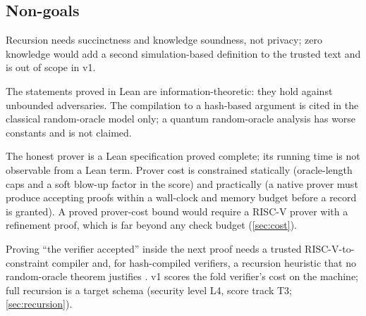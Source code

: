 \subsection{Non-goals}\label{subsec:obj-nongoals}

\begin{description}[leftmargin=0pt,itemsep=2pt]
\item[Zero knowledge.] Recursion needs succinctness and knowledge soundness, not privacy; zero
  knowledge would add a second simulation-based definition to the trusted text and is out of scope
  in v1.
\item[Quantum adversaries.] The statements proved in Lean are information-theoretic: they hold
  against unbounded adversaries. The compilation to a hash-based argument is cited in
  the classical random-oracle model only; a quantum random-oracle analysis \cite{CMS19} has worse
  constants and is not claimed.
\item[A prover-time score in v1.] The honest prover is a Lean specification proved complete; its
  running time is not observable from a Lean term. Prover cost is constrained statically
  (oracle-length caps and a soft blow-up factor in the score) and practically (a native prover must
  produce accepting proofs within a wall-clock and memory budget before a record is granted). A
  proved prover-cost bound would require a RISC-V prover with a refinement proof, which is far beyond
  any check budget (\cref{sec:cost}).
\item[Arithmetized recursion in v1.] Proving \enquote{the verifier accepted} inside the next proof
  needs a trusted RISC-V-to-constraint compiler and, for hash-compiled verifiers, a recursion
  heuristic that no random-oracle theorem justifies \cite{BCG24-RelROM}. v1 scores the fold
  verifier's cost on the machine; full recursion is a target schema (security level L4, score track
  T3; \cref{sec:recursion}).
\end{description}
